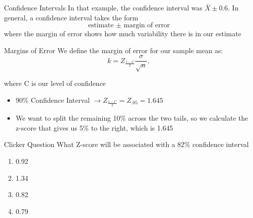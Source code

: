 \documentclass{beamer}
\begin{document}
\begin{frame}{Confidence Intervals}
	In that example, the confidence interval was $\bar{X} \pm 0.6$. In general, a confidence interval takes the form 
	$$\text{ estimate } \pm \text{ margin of error }$$
	where the \alert{margin of error} shows how much variability there is in our estimate
\end{frame}

\begin{frame}{Margins of Error}
	We define the margin of error for our sample mean as: \[
		k=Z_{\frac{1-C}{2}} \frac{\sigma}{\sqrt{n}},
	\]

	where C is our level of confidence
	
	\begin{itemize}
		\item 90\% Confidence Interval $\rightarrow Z_{\frac{1-C}{2}} = Z_{.05} = 1.645$ 
		
		\item We want to split the remaining 10\% across the two tails, so we calculate the z-score that gives us 5\% to the right, which is 1.645
	\end{itemize}
\end{frame}



\begin{frame}{Clicker Question}
	What Z-score will be associated with a 82\% confidence interval
	
	\begin{enumerate}[label=(\alph*)]
		\item 0.92
		\item 1.34 %
		\item 0.82
		\item 0.79
	\end{enumerate}
\end{frame}
\end{document}
